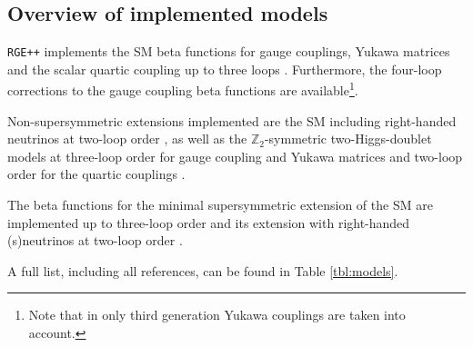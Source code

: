 \documentclass[11pt,a4paper]{article}
\begin{document}
\subsection{\label{sec::overview}Overview of implemented models}
\texttt{RGE++} implements the SM beta functions for gauge couplings, Yukawa matrices and the scalar quartic coupling up to three loops \cite{Machacek:1983tz,Machacek:1983fi,Machacek:1984zw,
                               Mihaila:2012fm,Mihaila:2012pz,Bednyakov:2012rb,Chetyrkin:2012rz,Bednyakov:2012en,Bednyakov:2014pia,Herren:2017uxn,Chetyrkin:2013wya,Bednyakov:2013eba,Bednyakov:2013cpa}.
Furthermore, the four-loop corrections to the gauge coupling beta functions \cite{Davies:2019onf} are available\footnote{Note that in \cite{Davies:2019onf} only third generation Yukawa couplings are taken into account.}.

Non-supersymmetric extensions implemented are the SM including right-handed neutrinos at two-loop order \cite{Machacek:1983tz,Machacek:1983fi,Machacek:1984zw, Antusch:2005gp, Grzadkowski:1987tf}, as well as
the $\mathbb{Z}_2$-symmetric two-Higgs-doublet models at three-loop order for gauge coupling and Yukawa matrices and two-loop order for the quartic couplings
\cite{Machacek:1983tz,Machacek:1983fi,Machacek:1984zw, Herren:2017uxn, Chowdhury:2015yja}.

The beta functions for the minimal supersymmetric extension of the SM are implemented up to three-loop order \cite{Martin:1993zk,Ferreira:1996ug} and its extension with right-handed (s)neutrinos at two-loop order
\cite{Martin:1993zk,Antusch:2005gp,Grzadkowski:1987wr}.

A full list, including all references, can be found in Table \ref{tbl:models}.
\end{document}
